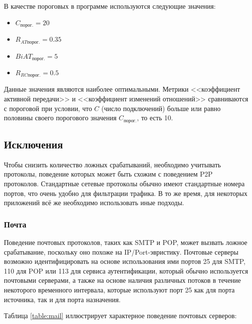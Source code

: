 \documentclass[bachelor, och, coursework]{SCWorks}
\begin{document}
В качестве пороговых в программе используются следующие значения:
\begin{itemize}
    \item $C_{\text{порог.}} = 20$
    \item $R_{AT\text{порог.}} = 0.35$
    \item $BiAT_{\text{порог.}} = 5$
    \item $R_{RC\text{порог.}} = 0.5$
\end{itemize}

Данные значения являются наиболее оптимальными. Метрики <<коэффициент активной передачи>> и <<коэффициент изменений отношений>> сравниваются с пороговой при условии, что $C$ (число подключений) больше или равно половины своего порогового значения $C_{\text{порог.}}$, то есть 10. 


\subsection{Исключения}
Чтобы снизить количество ложных срабатываний, необходимо учитывать протоколы, поведение которых может быть схожим с поведением P2P протоколов. Стандартные сетевые протоколы обычно имеют стандартные номера портов, что очень удобно для фильтрации трафика. В то же время, для некоторых приложений всё же необходимо использовать иные подходы.

\subsubsection{Почта}
Поведение почтовых протоколов, таких как SMTP и POP, может вызвать ложное срабатывание, поскольку оно похоже на IP/Port-эвристику. Почтовые серверы возможно идентифицировать на основе использования ими портов 25 для SMTP, 110 для POP или 113 для сервиса аутентификации, который обычно используется почтовыми серверами, а также на основе наличия различных потоков в течение некоторого временного интервала, которые используют порт 25 как для порта источника, так и для порта назначения.

Таблица \ref{table:mail} иллюстрирует характерное поведение почтовых серверов:
\end{document}
